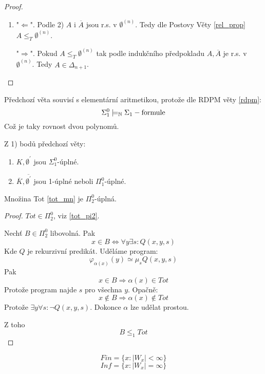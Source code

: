 \begin{proof}
\begin{enumerate}
		\item "$\Leftarrow$". Podle 2) $A$ i $\overline{A}$ jsou r.s. v $\emptyset^{(n)}$.
			Tedy dle Postovy Věty \cref{rel_prop} $A \leq_T \emptyset^{(n)}$.

			"$\Rightarrow$". Pokud $A \leq_T \emptyset^{(n)}$ tak podle indukčního předpokladu $A, \overline{A}$ je r.s. v $\emptyset^{(n)}$.
			Tedy $A \in \Delta_{n + 1}$.
	\end{enumerate}
\end{proof}

\begin{note}
	Předchozí věta souvisí s elementární aritmetikou, protože dle RDPM věty \cref{rdpm}:
	\[ \Sigma_1^0 \models_{\operatorname{\mathbb{N}}} \Sigma_1-\text{formule} \]
	Což je taky rovnost dvou polynomů.
\end{note}

Z 1) bodů předchozí věty:
\begin{consequence}[$K, \overline{K}$]
	\begin{enumerate}
		\item $K, \emptyset^{\prime}$ jsou $\Sigma_1^0$-úplné.
		\item $\overline{K}, \overline{\emptyset^{\prime}}$ jsou 1-úplné neboli $\Pi_1^0$-úplné.
	\end{enumerate}
\end{consequence}

\begin{theorem}
	Množina Tot \cref{tot_mn} je $\Pi_2^0$-úplná.
\end{theorem}
\begin{proof}
	$Tot \in \Pi_2^0$, viz \cref{tot_pi2}.

	Nechť $B \in \Pi_2^0$ libovolná.
	Pak
	\[ x \in B \iff \forall y \exists s: Q(x, y, s) \]
	Kde $Q$ je rekurzivní predikát.
	Uděláme program:
	\[ \varphi_{\alpha(x)}(y) \simeq \mu_s Q(x, y, s) \]
	Pak
	\[ x \in B \Rightarrow \alpha(x) \in Tot \]
	Protože program najde $s$ pro všechna $y$.
	Opačně:
	\[ x \notin B \Rightarrow \alpha(x) \notin Tot \]
	Protože $\exists y \forall s: \neg Q(x, y, s)$.
	Dokonce $\alpha$ lze udělat prostou.

	Z toho
	\[ B \leq_1 Tot \]
\end{proof}

\begin{definition}
	\[ Fin = \{ x: |W_x| < \infty \} \]
	\[ Inf = \{ x: |W_x| = \infty \} \]
\end{definition}

